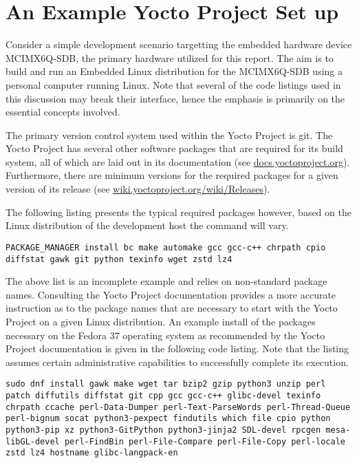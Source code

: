 \chapter{An Example Yocto Project Set up} \label{yocto-setup}

Consider a simple development scenario targetting the embedded hardware device MCIMX6Q-SDB, the primary hardware utilized for this report. The aim is to build and run an Embedded Linux distribution for the MCIMX6Q-SDB using a personal computer running Linux. Note that several of the code listings used in this discussion may break their interface, hence the emphasis is primarily on the essential concepts involved.

The primary version control system used within the Yocto Project is git. The Yocto Project has several other software packages that are required for its build system, all of which are laid out in its documentation (see \href{https://docs.yoctoproject.org/}{docs.yoctoproject.org}). Furthermore, there are minimum versions for the required packages for a given version of its release (see \href{https://wiki.yoctoproject.org/wiki/Releases}{wiki.yoctoproject.org/wiki/Releases}).

The following listing presents the typical required packages however, based on the Linux distribution of the development host the command will vary.

\begin{verbatim}
PACKAGE_MANAGER install bc make automake gcc gcc-c++ chrpath cpio diffstat gawk git python texinfo wget zstd lz4
\end{verbatim}

The above list is an incomplete example and relies on non-standard package names. Consulting the Yocto Project documentation provides a more accurate instruction as to the package names that are necessary to start with the Yocto Project on a given Linux distribution. An example install of the packages necessary on the Fedora 37 operating system as recommended by the Yocto Project documentation is given in the following code listing. Note that the listing assumes certain administrative capabilities to successfully complete its execution.

\begin{verbatim}
sudo dnf install gawk make wget tar bzip2 gzip python3 unzip perl patch diffutils diffstat git cpp gcc gcc-c++ glibc-devel texinfo chrpath ccache perl-Data-Dumper perl-Text-ParseWords perl-Thread-Queue perl-bignum socat python3-pexpect findutils which file cpio python python3-pip xz python3-GitPython python3-jinja2 SDL-devel rpcgen mesa-libGL-devel perl-FindBin perl-File-Compare perl-File-Copy perl-locale zstd lz4 hostname glibc-langpack-en
\end{verbatim}

